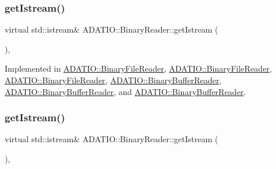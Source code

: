 \subsubsection{\texorpdfstring{getIstream()}{getIstream()}\hspace{0.1cm}{\footnotesize\ttfamily [2/3]}}
{\footnotesize\ttfamily virtual std\+::istream\& A\+D\+A\+T\+I\+O\+::\+Binary\+Reader\+::get\+Istream (\begin{DoxyParamCaption}{ }\end{DoxyParamCaption})\hspace{0.3cm}{\ttfamily [protected]}, {}}



Implemented in \mbox{\hyperlink{classADATIO_1_1BinaryFileReader_ae0985a1157f9baa87580606cfcf98908}{A\+D\+A\+T\+I\+O\+::\+Binary\+File\+Reader}}, \mbox{\hyperlink{classADATIO_1_1BinaryFileReader_ae0985a1157f9baa87580606cfcf98908}{A\+D\+A\+T\+I\+O\+::\+Binary\+File\+Reader}}, \mbox{\hyperlink{classADATIO_1_1BinaryFileReader_ae0985a1157f9baa87580606cfcf98908}{A\+D\+A\+T\+I\+O\+::\+Binary\+File\+Reader}}, \mbox{\hyperlink{classADATIO_1_1BinaryBufferReader_a32d746446a4c990f3c592a32753d7207}{A\+D\+A\+T\+I\+O\+::\+Binary\+Buffer\+Reader}}, \mbox{\hyperlink{classADATIO_1_1BinaryBufferReader_a32d746446a4c990f3c592a32753d7207}{A\+D\+A\+T\+I\+O\+::\+Binary\+Buffer\+Reader}}, and \mbox{\hyperlink{classADATIO_1_1BinaryBufferReader_a32d746446a4c990f3c592a32753d7207}{A\+D\+A\+T\+I\+O\+::\+Binary\+Buffer\+Reader}}.

\mbox{\label{classADATIO_1_1BinaryReader_aa34e73d5f1e6b2b3b48c27e97f6a85a0}} 
\subsubsection{\texorpdfstring{getIstream()}{getIstream()}\hspace{0.1cm}{\footnotesize\ttfamily [3/3]}}
{\footnotesize\ttfamily virtual std\+::istream\& A\+D\+A\+T\+I\+O\+::\+Binary\+Reader\+::get\+Istream (\begin{DoxyParamCaption}{ }\end{DoxyParamCaption})\hspace{0.3cm}{\ttfamily [protected]}, {}}



